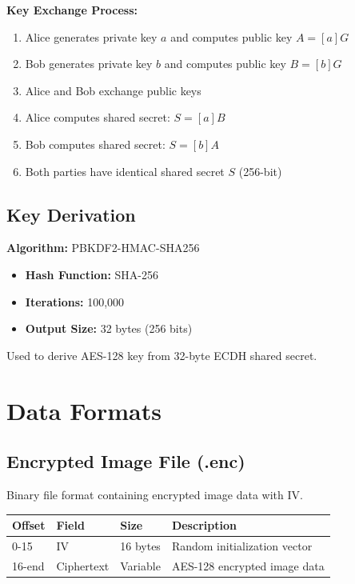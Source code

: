 \documentclass[12pt,a4paper]{report}
\begin{document}
\textbf{Key Exchange Process:}
\begin{enumerate}
    \item Alice generates private key $a$ and computes public key $A = [a]G$
    \item Bob generates private key $b$ and computes public key $B = [b]G$
    \item Alice and Bob exchange public keys
    \item Alice computes shared secret: $S = [a]B$
    \item Bob computes shared secret: $S = [b]A$
    \item Both parties have identical shared secret $S$ (256-bit)
\end{enumerate}

\subsection{Key Derivation}

\textbf{Algorithm:} PBKDF2-HMAC-SHA256

\begin{itemize}
    \item \textbf{Hash Function:} SHA-256
    \item \textbf{Iterations:} 100,000
    \item \textbf{Output Size:} 32 bytes (256 bits)
\end{itemize}

Used to derive AES-128 key from 32-byte ECDH shared secret.

\section{Data Formats}

\subsection{Encrypted Image File (.enc)}

Binary file format containing encrypted image data with IV.

\begin{table}[H]
    \centering
    \begin{tabular}{|l|l|l|l|}
    \hline
    \textbf{Offset} & \textbf{Field} & \textbf{Size} & \textbf{Description} \\
    \hline
    0-15 & IV & 16 bytes & Random initialization vector \\
    16-end & Ciphertext & Variable & AES-128 encrypted image data \\
    \hline
    \end{tabular}
\end{table}
\end{document}
